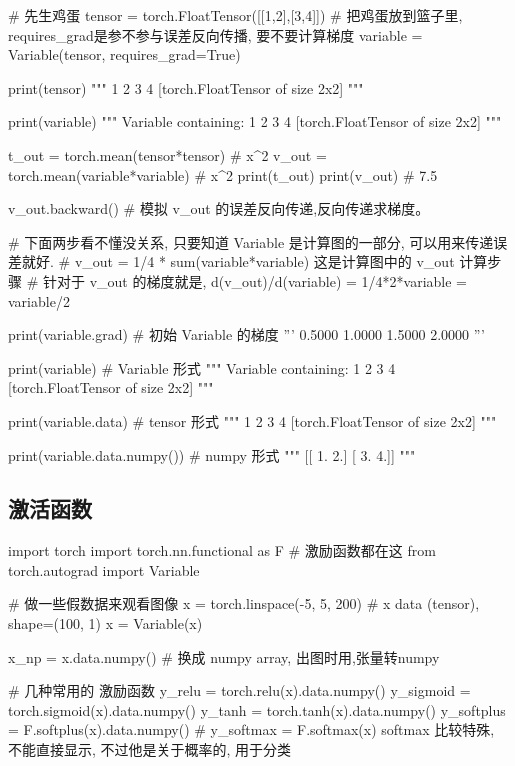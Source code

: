 \documentclass{article}
\begin{document}
\begin{python}
\begin{python}
			# 先生鸡蛋
			tensor = torch.FloatTensor([[1,2],[3,4]])
			# 把鸡蛋放到篮子里, requires_grad是参不参与误差反向传播, 要不要计算梯度
			variable = Variable(tensor, requires_grad=True)
			
			print(tensor)
			"""
			1  2
			3  4
			[torch.FloatTensor of size 2x2]
			"""
			
			print(variable)
			"""
			Variable containing:
			1  2
			3  4
			[torch.FloatTensor of size 2x2]
			"""
			
			t_out = torch.mean(tensor*tensor)       # x^2
			v_out = torch.mean(variable*variable)   # x^2
			print(t_out)
			print(v_out)    # 7.5
			
			v_out.backward()    # 模拟 v_out 的误差反向传递,反向传递求梯度。
			
			# 下面两步看不懂没关系, 只要知道 Variable 是计算图的一部分, 可以用来传递误差就好.
			# v_out = 1/4 * sum(variable*variable) 这是计算图中的 v_out 计算步骤
			# 针对于 v_out 的梯度就是, d(v_out)/d(variable) = 1/4*2*variable = variable/2
			
			print(variable.grad)    # 初始 Variable 的梯度
			'''
			0.5000  1.0000
			1.5000  2.0000
			'''
			
			print(variable)     #  Variable 形式
			"""
			Variable containing:
			1  2
			3  4
			[torch.FloatTensor of size 2x2]
			"""
			
			print(variable.data)    # tensor 形式
			"""
			1  2
			3  4
			[torch.FloatTensor of size 2x2]
			"""
			
			print(variable.data.numpy())    # numpy 形式
			"""
			[[ 1.  2.]
			[ 3.  4.]]
			"""
		\end{python}
	\subsection{激活函数}
	\begin{python}
		import torch
		import torch.nn.functional as F     # 激励函数都在这
		from torch.autograd import Variable
		
		# 做一些假数据来观看图像
		x = torch.linspace(-5, 5, 200)  # x data (tensor), shape=(100, 1)
		x = Variable(x)
		
		x_np = x.data.numpy()   # 换成 numpy array, 出图时用,张量转numpy
		
		# 几种常用的 激励函数
		y_relu = torch.relu(x).data.numpy()
		y_sigmoid = torch.sigmoid(x).data.numpy()
		y_tanh = torch.tanh(x).data.numpy()
		y_softplus = F.softplus(x).data.numpy()
		# y_softmax = F.softmax(x)  softmax 比较特殊, 不能直接显示, 不过他是关于概率的, 用于分类
		

\end{python}
\end{python}
\end{document}
